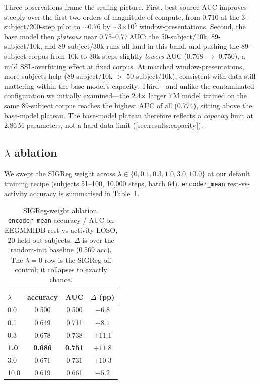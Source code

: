 Three observations frame the scaling picture. First, best-source AUC
improves steeply over the first two orders of magnitude of compute, from
0.710 at the 3-subject/200-step pilot to $\sim$0.76 by
$\sim$3$\times$10$^{5}$ window-presentations. Second, the base model then
\emph{plateaus} near 0.75--0.77\,AUC: the 50-subject/10k, 89-subject/10k,
and 89-subject/30k runs all land in this band, and pushing the 89-subject
corpus from 10k to 30k steps slightly \emph{lowers} AUC (0.768
$\rightarrow$ 0.750), a mild SSL-overfitting effect at fixed corpus. At
matched window-presentations, more subjects help (89-subject/10k $>$
50-subject/10k), consistent with data still mattering within the base
model's capacity. Third---and unlike the contaminated configuration we
initially examined---the 2.4$\times$ larger 7\,M model trained on the same
89-subject corpus reaches the highest AUC of all (0.774), sitting above the
base-model plateau. The base-model plateau therefore reflects a
\emph{capacity} limit at 2.86\,M parameters, not a hard data limit
(\cref{sec:results:capacity}).

\subsection{$\lambda$ ablation}
\label{sec:results:lambda}

We swept the SIGReg weight across
$\lambda \in \{0, 0.1, 0.3, 1.0, 3.0, 10.0\}$ at our default training
recipe (subjects 51--100, 10{,}000 steps, batch 64).
\texttt{encoder\_mean} rest-vs-activity accuracy is summarised in
Table~\ref{tab:lambda}.

\begin{table}[t]
\caption{SIGReg-weight ablation. \texttt{encoder\_mean} accuracy / AUC on EEGMMIDB rest-vs-activity LOSO, 20 held-out subjects. $\Delta$ is over the random-init baseline (0.569 acc). The $\lambda{=}0$ row is the SIGReg-off control; it collapses to exactly chance.}
\label{tab:lambda}
\centering
\small
\begin{tabular}{l c c c}
\toprule
$\lambda$ & accuracy & AUC & $\Delta$ (pp) \\
\midrule
0.0   & 0.500 & 0.500 & $-6.8$ \\
0.1   & 0.649 & 0.711 & $+8.1$  \\
0.3   & 0.678 & 0.738 & $+11.1$  \\
\textbf{1.0} & \textbf{0.686} & \textbf{0.751} & \textbf{$+11.8$} \\
3.0   & 0.671 & 0.731 & $+10.3$  \\
10.0  & 0.619 & 0.661 & $+5.2$  \\
\bottomrule
\end{tabular}
\end{table}

